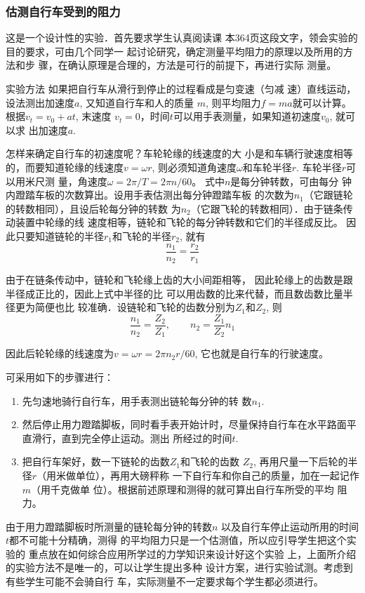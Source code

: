 \subsubsection{估测自行车受到的阻力}
这是一个设计性的实验．首先要求学生认真阅读课
本364页这段文字，领会实验的目的要求，可由几个同学一
起讨论研究，确定测量平均阻力的原理以及所用的方法和步
骤，在确认原理是合理的，方法是可行的前提下，再进行实际
测量。

实验方法
如果把自行车从滑行到停止的过程看成是匀变速（匀减
速）直线运动，设法测出加速度$a$, 又知道自行车和人的质量
$m$, 则平均阻力$f=ma$就可以计算。根据$v_t=v_0+at$, 末速度
$v_t=0$，时间$t$可以用手表测量，如果知道初速度$v_0$, 就可以求
出加速度$a$.

怎样来确定自行车的初速度呢？车轮轮缘的线速度的大
小是和车辆行驶速度相等的，而要知道轮缘的线速度$v=\omega r$,
则必须知道角速度$\omega$和车轮半径$r$. 车轮半径$r$可以用米尺测
量，角速度$ω=2\pi/T=2\pi n/60$。
式中$n$是每分钟转数，可由每分
钟内蹬踏车板的次数算出。设用手表估测出每分钟蹬踏车板
的次数为$n_1$（它跟链轮的转数相同），且设后轮每分钟的转数
为$n_2$（它跟飞轮的转数相同）．由于链条传动装置中轮缘的线
速度相等，链轮和飞轮的每分钟转数和它们的半径成反比。
因此只要知道链轮的半径$r_1$和飞轮的半径$r_2$, 就有
\[\frac{n_1}{n_2}=\frac{r_2}{r_1}\]

由于在链条传动中，链轮和飞轮缘上齿的大小间距相等，
因此轮缘上的齿数是跟半径成正比的，因此上式中半径的比
可以用齿数的比来代替，而且数齿数比量半径更为简便也比
较准确．设链轮和飞轮的齿数分别为$Z_1$和$Z_2$, 则
\[\frac{n_1}{n_2}=\frac{Z_2}{Z_1},\qquad n_2=\frac{Z_1}{Z_2}n_1\]

因此后轮轮缘的线速度为$v=\omega r=2\pi n_2r/60$, 
它也就是自行车的行驶速度。

可采用如下的步骤进行：
\begin{enumerate}
    \item 先匀速地骑行自行车，用手表测出链轮每分钟的转
数$n_1$.
\item 然后停止用力蹬踏脚板，同时看手表开始计时，尽量保持自行车在水平路面平直滑行，直到完全停止运动。测出
所经过的时间$t$.
\item 把自行车架好，数一下链轮的齿数$Z_1$和飞轮的齿数
$Z_2$, 再用尺量一下后轮的半径$r$（用米做单位），再用大磅秤称
一下自行车和你自己的质量，加在一起记作$m$（用千克做单
位）。根据前述原理和测得的就可算出自行车所受的平均
阻力。
\end{enumerate}

由于用力蹬踏脚板时所测量的链轮每分钟的转数$n$
以及自行车停止运动所用的时间$t$都不可能十分精确，测得
的平均阻力只是一个估测值，所以应引导学生把这个实验的
重点放在如何综合应用所学过的力学知识来设计好这个实验
上，上面所介绍的实验方法不是唯一的，可以让学生提出多种
设计方案，进行实验试测。考虑到有些学生可能不会骑自行
车，实际测量不一定要求每个学生都必须进行。

